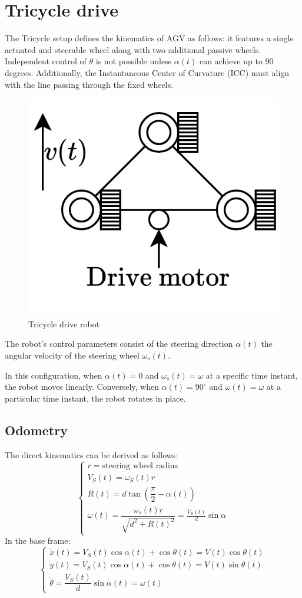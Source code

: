 \section{Tricycle drive}

The Tricycle setup defines the kinematics of AGV as follows: it features a single actuated and steerable wheel along with two additional passive wheels. 
Independent control of $\theta$ is not possible unless $\alpha(t)$ can achieve up to 90 degrees. 
Additionally, the Instantaneous Center of Curvature (ICC) must align with the line passing through the fixed wheels.
\begin{figure}[H]
    \centering
    \includegraphics[width=0.25\linewidth]{images/syn.png} 
    \caption{Tricycle drive robot}
\end{figure}
The robot's control parameters consist of the steering direction $\alpha(t)$ the angular velocity of the steering wheel $\omega_s(t)$. 

In this configuration, when $\alpha(t)=0$ and $\omega_s(t)=\omega$ at a specific time instant, the robot moves linearly. 
Conversely, when $\alpha(t)=90^\circ$ and $\omega(t)=\omega$ at a particular time instant, the robot rotates in place. 

\subsection{Odometry}
The direct kinematics can be derived as follows: 
\[\begin{cases}
    r = \text{steering wheel radius} \\
    V_S(t)=\omega_S(t)r \\
    R(t)=d\tan\left(\dfrac{\pi}{2}-\alpha(t)\right) \\
    \omega(t)=\dfrac{\omega_s(t)r}{\sqrt{d^2+R(t)^2}}=\frac{V_S(t)}{d}\sin\alpha
\end{cases}\]
In the base frame: 
\[\begin{cases}
    \dot{x}(t)=V_S(t)\cos\alpha(t)+\cos\theta(t)=V(t)\cos\theta(t) \\
    \dot{y}(t)=V_S(t)\cos\alpha(t)+\cos\theta(t)=V(t)\sin\theta(t) \\
    \dot{\theta}=\dfrac{V_S(t)}{d}\sin\alpha(t)=\omega(t)
\end{cases}\]
